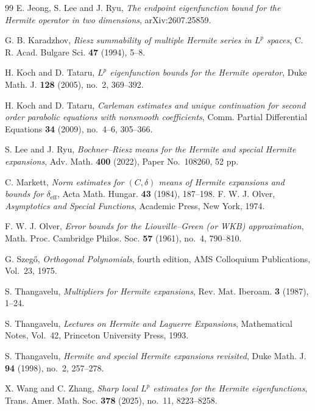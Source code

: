 \documentclass[11pt,a4paper]{amsart}
\numberwithin{equation}{section}
\begin{document}
\begin{thebibliography}{99}
E. Jeong, S. Lee and J. Ryu,
\emph{The endpoint eigenfunction bound for the Hermite operator in two
dimensions},
arXiv:2607.25859.

G. B. Karadzhov,
\emph{Riesz summability of multiple Hermite series in \(L^p\) spaces},
C. R. Acad. Bulgare Sci. \textbf{47} (1994), 5--8.

H. Koch and D. Tataru,
\emph{\(L^p\) eigenfunction bounds for the Hermite operator},
Duke Math. J. \textbf{128} (2005), no.~2, 369--392.

H. Koch and D. Tataru,
\emph{Carleman estimates and unique continuation for second order parabolic
equations with nonsmooth coefficients},
Comm. Partial Differential Equations \textbf{34} (2009), no.~4--6, 305--366.

S. Lee and J. Ryu,
\emph{Bochner--Riesz means for the Hermite and special Hermite expansions},
Adv. Math. \textbf{400} (2022), Paper No.~108260, 52 pp.

C. Markett,
\emph{Norm estimates for \((C,\delta)\) means of Hermite expansions and
bounds for \(\delta_{\mathrm{eff}}\)},
Acta Math. Hungar. \textbf{43} (1984), 187--198.
F. W. J. Olver,
\emph{Asymptotics and Special Functions},
Academic Press, New York, 1974.

F. W. J. Olver,
\emph{Error bounds for the Liouville--Green (or WKB) approximation},
Math. Proc. Cambridge Philos. Soc. \textbf{57} (1961), no.~4, 790--810.

G. Szeg\H{o},
\emph{Orthogonal Polynomials}, fourth edition,
AMS Colloquium Publications, Vol.~23, 1975.

S. Thangavelu,
\emph{Multipliers for Hermite expansions},
Rev. Mat. Iberoam. \textbf{3} (1987), 1--24.

S. Thangavelu,
\emph{Lectures on Hermite and Laguerre Expansions},
Mathematical Notes, Vol.~42,
Princeton University Press, 1993.

S. Thangavelu,
\emph{Hermite and special Hermite expansions revisited},
Duke Math. J. \textbf{94} (1998), no.~2, 257--278.

X. Wang and C. Zhang,
\emph{Sharp local \(L^p\) estimates for the Hermite eigenfunctions},
Trans. Amer. Math. Soc. \textbf{378} (2025), no.~11, 8223--8258.



\end{thebibliography}
\end{document}
